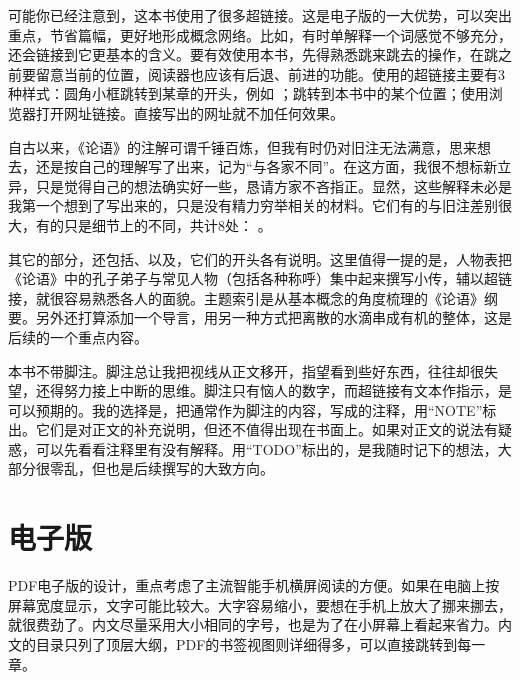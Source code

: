 可能你已经注意到，这本书使用了很多超链接。这是电子版的一大优势，可以突出重点，节省篇幅，更好地形成概念网络。比如，有时单解释一个词感觉不够充分，还会链接到它更基本的含义。要有效使用本书，先得熟悉跳来跳去的操作，在跳之前要留意当前的位置，阅读器也应该有后退、前进的功能。使用的超链接主要有3种样式：圆角小框跳转到某章的开头，例如 ；跳转到本书中的某个位置；使用浏览器打开网址链接。直接写出的网址就不加任何效果。

自古以来，《论语》的注解可谓千锤百炼，但我有时仍对旧注无法满意，思来想去，还是按自己的理解写了出来，记为“与各家不同”。在这方面，我很不想标新立异，只是觉得自己的想法确实好一些，恳请方家不吝指正。显然，这些解释未必是我第一个想到了写出来的，只是没有精力穷举相关的材料。它们有的与旧注差别很大，有的只是细节上的不同，共计8处：       。

其它的部分，还包括、以及，它们的开头各有说明。这里值得一提的是，人物表把《论语》中的孔子弟子与常见人物（包括各种称呼）集中起来撰写小传，辅以超链接，就很容易熟悉各人的面貌。主题索引是从基本概念的角度梳理的《论语》纲要。另外还打算添加一个导言，用另一种方式把离散的水滴串成有机的整体，这是后续的一个重点内容。

本书不带脚注。脚注总让我把视线从正文移开，指望看到些好东西，往往却很失望，还得努力接上中断的思维。脚注只有恼人的数字，而超链接有文本作指示，是可以预期的。我的选择是，把通常作为脚注的内容，写成的注释，用“NOTE”标出。它们是对正文的补充说明，但还不值得出现在书面上。如果对正文的说法有疑惑，可以先看看注释里有没有解释。用“TODO”标出的，是我随时记下的想法，大部分很零乱，但也是后续撰写的大致方向。



\lypdfbookmark\section*{电子版}

PDF电子版的设计，重点考虑了主流智能手机横屏阅读的方便。如果在电脑上按屏幕宽度显示，文字可能比较大。大字容易缩小，要想在手机上放大了挪来挪去，就很费劲了。内文尽量采用大小相同的字号，也是为了在小屏幕上看起来省力。内文的目录只列了顶层大纲，PDF的书签视图则详细得多，可以直接跳转到每一章。

